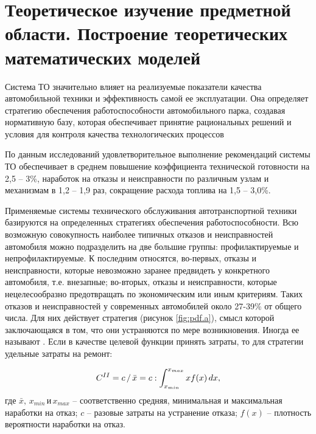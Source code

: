 \documentclass[../nirs.tex]{subfiles}
\begin{document}
\section{Теоретическое изучение предметной области. Построение теоретических
математических моделей}

Система ТО значительно влияет на реализуемые показатели качества автомобильной
техники и эффективность самой ее эксплуатации. Она определяет стратегию
обеспечения работоспособности автомобильного парка, создавая нормативную базу,
которая обеспечивает принятие рациональных решений и условия для контроля
качества технологических процессов

По данным исследований удовлетворительное выполнение рекомендаций системы ТО
обеспечивает в среднем повышение коэффициента технической готовности на 2,5 --
3\%, наработок на отказы и неисправности по различным узлам и механизмам в 1,2
-- 1,9 раз, сокращение расхода топлива на 1,5 -- 3,0\%.

Применяемые системы технического обслуживания автотранспортной техники
базируются на определенных стратегиях обеспечения работоспособности. Всю
возможную совокупность наиболее типичных отказов и неисправностей автомобиля
можно подразделить на две большие группы: профилактируемые и
непрофилактируемые. К последним относятся, во-первых, отказы и неисправности,
которые невозможно заранее предвидеть у конкретного автомобиля, т.е. внезапные;
во-вторых, отказы и неисправности, которые нецелесообразно предотвращать по
экономическим или иным критериям. Таких отказов и неисправностей у современных
автомобилей около 27-39\% от общего числа. Для них действует стратегия 
(рисунок \ref{fig:pdf.a}), смысл которой заключающаяся в том, что они
устраняются по мере возникновения. Иногда ее называют . Если в качестве целевой функции принять затраты, то для
стратегии  удельные затраты на ремонт:

\begin{equation*}
    C^{\rom{2}} =
    c\,/\,\bar{x} =
    c : \int_{x_{min}}^{x_{max}} x f(x)\,dx,
\end{equation*}
где $\bar{x},\,x_{min} \,\text{и} \,x_{max}$ -- соответственно средняя,
минимальная и максимальная наработки на отказ; $c$ -- разовые затраты на
устранение отказа; $f(x)$ -- плотность вероятности наработки на отказ.
\end{document}
